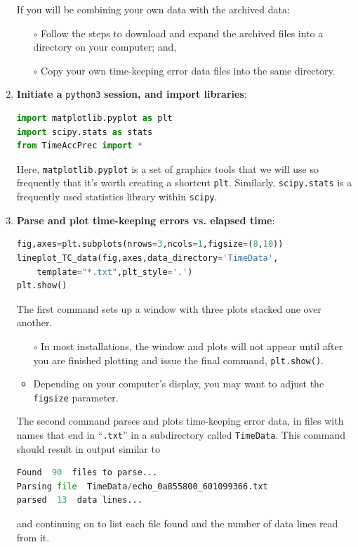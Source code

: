 \begin{enumerate}
	\smallskip
	If you will be combining your own data with the archived data:
	\begin{itemize}
		\item[$\circ$] Follow the steps to download and expand the archived files into a directory on your computer; and,
		\item[$\circ$] Copy your own time-keeping error data files into the same directory. 
	\end{itemize}
	
	\item \textbf{Initiate a } \lstinline{python3} \textbf{session, and import libraries}:
\begin{lstlisting}[language=Python]
import matplotlib.pyplot as plt
import scipy.stats as stats
from TimeAccPrec import * 
\end{lstlisting}
	Here, \lstinline{matplotlib.pyplot} is a set of graphics tools that we will use so frequently that it's worth creating a shortcut \lstinline{plt}.
	Similarly, \lstinline{scipy.stats} is a frequently used statistics library within \lstinline{scipy}.

	\item \textbf{Parse and plot time-keeping errors vs. elapsed time}:
\begin{lstlisting}[language=Python]
fig,axes=plt.subplots(nrows=3,ncols=1,figsize=(8,10))
lineplot_TC_data(fig,axes,data_directory='TimeData',
    template="*.txt",plt_style='.')
plt.show()
\end{lstlisting}
	The first command sets up a window with three plots stacked one over another.
	\begin{itemize}
		\item[$\circ$] In most \python installations, the window and plots will not appear until after you are finished plotting and issue the final command, \lstinline{plt.show()}.
		\item[$\circ$] Depending on your computer's display, you may want to adjust the \lstinline{figsize} parameter.
	\end{itemize}
	The second command parses and plots time-keeping error data, in files with names that end in ``\lstinline{.txt}'' in a subdirectory called \lstinline{TimeData}.
	This command should result in output similar to
\begin{lstlisting}[language=Python]
Found  90  files to parse...
Parsing file  TimeData/echo_0a855800_601099366.txt
parsed  13  data lines...
\end{lstlisting}
	and continuing on to list each file found and the number of data lines read from it.
	

\end{enumerate}

